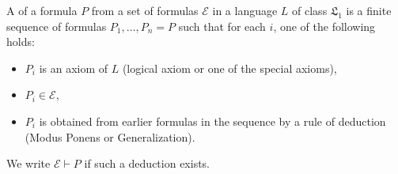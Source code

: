 A  of a formula $P$ from a set of formulas $\mathcal{E}$ in a language $L$ of class $\mathfrak{L}_1$ is a finite sequence of formulas $P_1, \ldots, P_n = P$ such that for each $i$, one of the following holds:
\begin{itemize}
\item $P_i$ is an axiom of $L$ (logical axiom or one of the special axioms),
\item $P_i \in \mathcal{E}$,
\item $P_i$ is obtained from earlier formulas in the sequence by a rule of deduction (Modus Ponens or Generalization).
\end{itemize}
We write $\mathcal{E} \vdash P$ if such a deduction exists.
